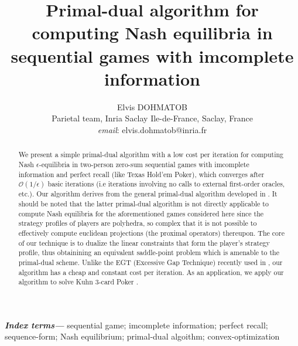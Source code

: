 \documentclass[12pt]{article}
\author{
Elvis DOHMATOB
\\
Parietal team, Inria Saclay Ile-de-France, Saclay, France\\
\textit{email}: elvis.dohmatob@inria.fr}
\title{\bf Primal-dual algorithm for computing Nash equilibria in
sequential games with imcomplete information
}
\providecommand{\keywords}[1]{\textbf{\textit{Index terms---}} #1}
\begin{document}
\maketitle

\begin{abstract}
We present a simple primal-dual algorithm with a low cost per iteration for computing Nash $\epsilon$-equilibria in two-person zero-sum sequential games with imcomplete information and perfect recall (like Texas Hold'em Poker), which converges after $\mathcal{O}(1/\epsilon)$ basic iterations
(i.e iterations involving no
calls to external first-order oracles, etc.). %
Our algorithm derives from the general primal-dual algorithm developed
in \cite{chambolle2010, chambolle2014ergodic}. It should be noted that the latter primal-dual algorithm is not directly applicable to compute Nash equilibria for the aforementioned games considered here since the strategy profiles of players are polyhedra, so complex that it is not possible
 to effectively compute %
euclidean
 projections (the proximal operators) thereupon.
The core of our technique is to dualize the linear constraints that form the player's strategy profile, thus obtainining an equivalent saddle-point problem which is amenable to the primal-dual scheme. Unlike the EGT (Excessive Gap Technique) recently used in \cite{hoda2010smoothing, gilpinfirst}, our algorithm has a cheap and constant cost per iteration. As an application, we apply our algorithm to solve Kuhn 3-card Poker \cite{kuhn}.
\end{abstract}

\keywords{sequential game; imcomplete information; perfect recall; sequence-form; Nash equilibrium; primal-dual algoithm; convex-optimization}
\end{document}
